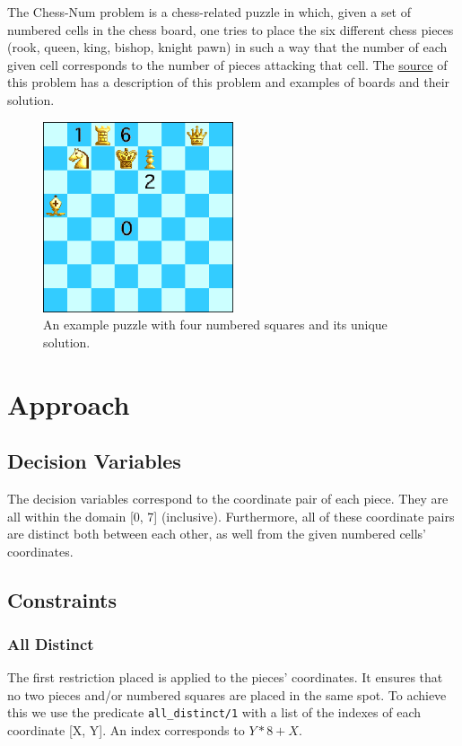 \documentclass[runningheads]{llncs}
\newcommand{\inlinecode}[1]{\texttt{#1}}
\begin{document}
The Chess-Num problem is a chess-related puzzle in which, given a set of
numbered cells in the chess board, one tries to place the six different chess
pieces (rook, queen, king, bishop, knight pawn) in such a way that the number
of each given cell corresponds to the number of pieces attacking that cell.
The \href{https://erich-friedman.github.io/puzzle/chessnum/}{source} of this
problem has a description of this problem and examples of boards and their solution.
\begin{figure}[H]
  \centering
  \includegraphics[width=0.5\textwidth]{figures/chessdemo.eps}
  \caption{An example puzzle with four numbered squares and its unique solution.}\label{fig:fig1}
\end{figure}

\section{Approach}
\subsection{Decision Variables}

The decision variables correspond to the coordinate pair of each piece. They are all
within the domain [0, 7] (inclusive). Furthermore, all of these coordinate pairs are
distinct both between each other, as well from the given numbered cells' coordinates.

\subsection{Constraints}
\subsubsection{All Distinct}
The first restriction placed is applied to the pieces' coordinates. It ensures that
no two pieces and/or numbered squares are placed in the same spot. To achieve
this we use the predicate \inlinecode{all\_distinct/1} with a list of the indexes of
each coordinate [X, Y]. An index corresponds to $Y * 8 + X$.
\end{document}
